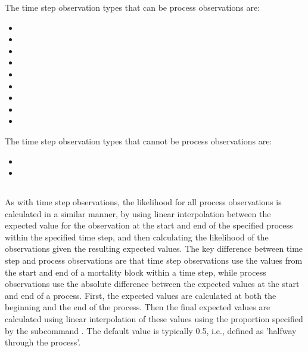 The time step observation types that can be process observations are:

\begin{itemize}
	\item {}
	\item {}
	\item {}
	\item {}
	\ifAgeBased
	\item {}
	\fi
	\item {}
	\item {}
	\ifAgeBased
	\item {}
	\item {}
	\fi
\end{itemize}
	
The time step observation types that cannot be process observations are:
\begin{itemize}
	\ifAgeBased
	\item {}
	\fi
    \item {}
\end{itemize}

\subsection{ \label{sec:ProcessObservations}}

As with time step observations, the likelihood for all process observations is calculated in a similar manner, by using linear interpolation between the expected value for the observation at the start and end of the specified process within the specified time step, and then calculating the likelihood of the observations given the resulting expected values. The key difference between time step and process observations are that time step observations use the values from the start and end of a mortality block within a time step, while process observations use the absolute difference between the expected values at the start and end of a process. First, the expected values are calculated at both the beginning and the end of the process. Then the final expected values are calculated using linear interpolation of these values using the proportion specified by the subcommand . The default value is typically 0.5, i.e., defined as 'halfway through the process'.

